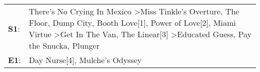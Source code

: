 \begin{supertabular}{p{0.03\textwidth}p{0.92\textwidth}}
 \textbf{S1}:  &  There's No Crying In Mexico\textsuperscript{} \textgreater \enspace Miss Tinkle's Overture\textsuperscript{}, \enspace The Floor\textsuperscript{}, \enspace Dump City\textsuperscript{}, \enspace Booth Love[1]\textsuperscript{}, \enspace Power of Love[2]\textsuperscript{}, \enspace Miami Virtue\textsuperscript{} \textgreater \enspace Get In The Van\textsuperscript{}, \enspace The Linear[3]\textsuperscript{} \textgreater \enspace Educated Guess\textsuperscript{}, \enspace Pay the Snucka\textsuperscript{}, \enspace Plunger\textsuperscript{}  \enspace  \\
 \textbf{E1}:  &                                                                                                                                                                                                                                                                                                                                                                                                                                                                                      Day Nurse[4]\textsuperscript{}, \enspace Mulche's Odyssey\textsuperscript{}  \enspace  \\
\end{supertabular}
